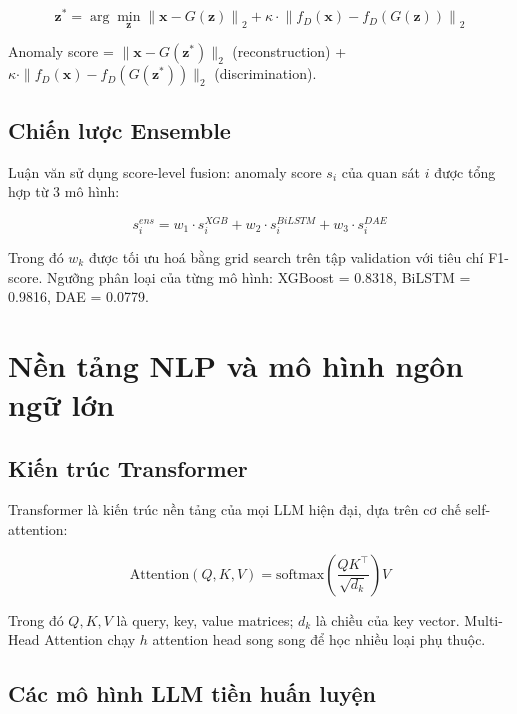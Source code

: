 \begin{equation}
  \mathbf{z}^* = \arg\min_{\mathbf{z}} \left\| \mathbf{x} - G(\mathbf{z}) \right\|_2 + \kappa \cdot \left\| f_D(\mathbf{x}) - f_D(G(\mathbf{z})) \right\|_2
  \label{eq:anogan}
\end{equation}

Anomaly score = $\|\mathbf{x} - G(\mathbf{z}^*)\|_2$ (reconstruction) + $\kappa \cdot \|f_D(\mathbf{x}) - f_D(G(\mathbf{z}^*))\|_2$ (discrimination).

\subsection{Chiến lược Ensemble}

Luận văn sử dụng score-level fusion: anomaly score $s_i$ của quan sát $i$ được tổng hợp từ 3 mô hình:

\begin{equation}
  s_i^{ens} = w_1 \cdot s_i^{XGB} + w_2 \cdot s_i^{BiLSTM} + w_3 \cdot s_i^{DAE}
  \label{eq:ensemble}
\end{equation}

Trong đó $w_k$ được tối ưu hoá bằng grid search trên tập validation với tiêu chí F1-score. Ngưỡng phân loại của từng mô hình: XGBoost = 0.8318, BiLSTM = 0.9816, DAE = 0.0779.

\section{Nền tảng NLP và mô hình ngôn ngữ lớn}

\subsection{Kiến trúc Transformer}

Transformer \cite{vaswani2017attention} là kiến trúc nền tảng của mọi LLM hiện đại, dựa trên cơ chế self-attention:

\begin{equation}
  \text{Attention}(Q, K, V) = \text{softmax}\!\left(\frac{QK^\top}{\sqrt{d_k}}\right) V
  \label{eq:attention}
\end{equation}

Trong đó $Q, K, V$ là query, key, value matrices; $d_k$ là chiều của key vector. Multi-Head Attention chạy $h$ attention head song song để học nhiều loại phụ thuộc.

\subsection{Các mô hình LLM tiền huấn luyện}

